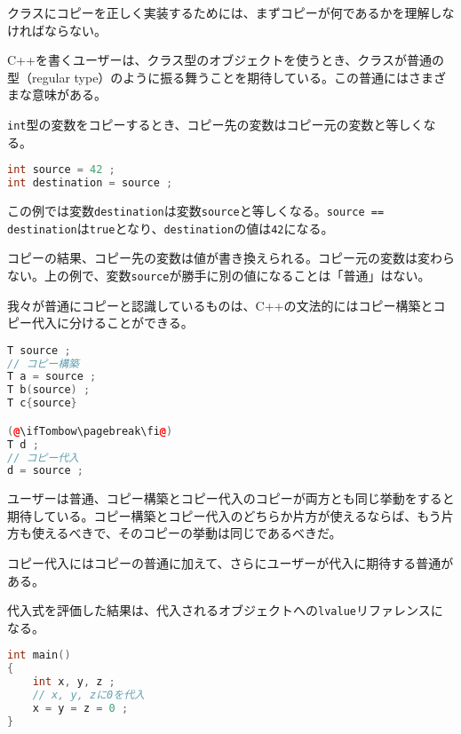 
クラスにコピーを正しく実装するためには、まずコピーが何であるかを理解しなければならない。


C++を書くユーザーは、クラス型のオブジェクトを使うとき、クラスが普通の型（regular type）のように振る舞うことを期待している。この普通にはさまざまな意味がある。

\texttt{int}型の変数をコピーするとき、コピー先の変数はコピー元の変数と等しくなる。

\begin{lstlisting}[language={C++}]
int source = 42 ;
int destination = source ;
\end{lstlisting}

この例では変数\texttt{destination}は変数\texttt{source}と等しくなる。\texttt{source == destination}は\texttt{true}となり、\texttt{destination}の値は\texttt{42}になる。

コピーの結果、コピー先の変数は値が書き換えられる。コピー元の変数は変わらない。上の例で、変数\texttt{source}が勝手に別の値になることは「普通」はない。

我々が普通にコピーと認識しているものは、C++の文法的にはコピー構築とコピー代入に分けることができる。

\begin{lstlisting}[language={C++}]
T source ;
// コピー構築
T a = source ;
T b(source) ;
T c{source}

(@\ifTombow\pagebreak\fi@)
T d ;
// コピー代入
d = source ;
\end{lstlisting}

ユーザーは普通、コピー構築とコピー代入のコピーが両方とも同じ挙動をすると期待している。コピー構築とコピー代入のどちらか片方が使えるならば、もう片方も使えるべきで、そのコピーの挙動は同じであるべきだ。

コピー代入にはコピーの普通に加えて、さらにユーザーが代入に期待する普通がある。

代入式を評価した結果は、代入されるオブジェクトへの\texttt{lvalue}リファレンスになる。

\begin{lstlisting}[language={C++}]
int main()
{
    int x, y, z ;
    // x, y, zに0を代入
    x = y = z = 0 ;
}
\end{lstlisting}

